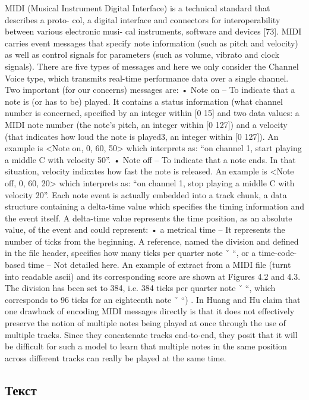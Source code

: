 MIDI (Musical Instrument Digital Interface) is a technical standard that describes a proto- col, a digital interface and connectors for interoperability between various electronic musi- cal instruments, software and devices [73]. MIDI carries event messages that specify note information (such as pitch and velocity) as well as control signals for parameters (such as volume, vibrato and clock signals). There are five types of messages and here we only consider the Channel Voice type, which transmits real-time performance data over a single channel. Two important (for our concerns) messages are:
• Note on – To indicate that a note is (or has to be) played. It contains a status information (what channel number is concerned, specified by an integer within [0 15] and two
data values: a MIDI note number (the note’s pitch, an integer within [0 127]) and a velocity (that indicates how loud the note is played3, an integer within [0 127]). An example is <Note on, 0, 60, 50> which interprets as: “on channel 1, start playing a middle C with velocity 50”.
• Note off – To indicate that a note ends. In that situation, velocity indicates how fast the note is released. An example is <Note off, 0, 60, 20> which interprets as: “on
channel 1, stop playing a middle C with velocity 20”.
Each note event is actually embedded into a track chunk, a data structure containing a delta-time value which specifies the timing information and the event itself. A delta-time value represents the time position, as an absolute value, of the event and could represent:
• a metrical time – It represents the number of ticks from the beginning. A reference, named the division and defined in the file header, specifies how many ticks per quarter
note ˇ “, or a time-code-based time – Not detailed here. An example of extract from a MIDI file (turnt into readable ascii) and its corresponding
score are shown at Figures 4.2 and 4.3. The division has been set to 384, i.e. 384 ticks per quarter note ˇ “, which corresponds to 96 ticks for an eighteenth note ˇ “) .
In Huang and Hu claim that one drawback of encoding MIDI messages directly
is that it does not effectively preserve the notion of multiple notes being played at once through the use of multiple tracks. Since they concatenate tracks end-to-end, they posit that it will be difficult for such a model to learn that multiple notes in the same position across different tracks can really be played at the same time.

\subsection{Текст}

